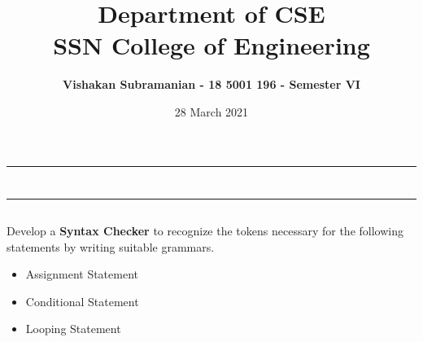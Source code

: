 \documentclass[12pt, a4]{article}
\title{\textbf{Department of CSE\\SSN College of Engineering}}
\author{\textbf{Vishakan Subramanian - 18 5001 196 - Semester VI}}
\date{28 March 2021}
\begin{document}
\maketitle
\hrule
\section*{}
\hrule
\bigskip

\subsection*{}
\subsection*{}
\begin{flushleft}
Develop a \textbf{Syntax Checker} to recognize the tokens necessary for the following statements by writing suitable grammars.

\begin{itemize}
\item Assignment Statement
\item Conditional Statement
\item Looping Statement
\end{itemize}

\end{flushleft}

\newpage
\subsection*{}
\begin{flushleft}

\end{flushleft}

\newpage
\subsection*{}
\begin{flushleft}

\end{flushleft}

\newpage
\subsection*{}
\begin{flushleft}

\end{flushleft}
\end{document}

